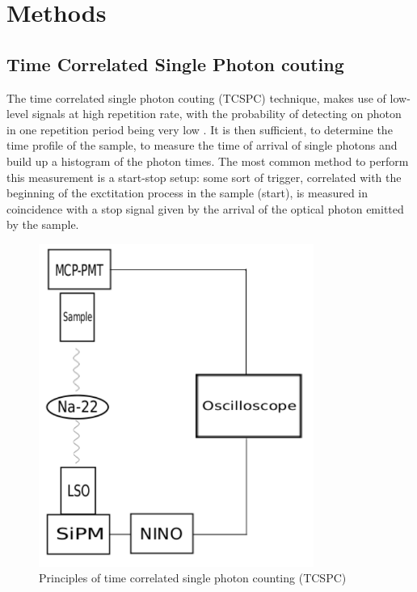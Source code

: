 
\chapter{Methods}


\section{Time Correlated Single Photon couting}

The time correlated single photon couting (TCSPC) technique, makes use of low-level signals at high repetition rate, with the probability of detecting on photon in one repetition period being very low \cite{Becker2005}.
It is then sufficient, to determine the time profile of the sample, to measure the time of arrival of single photons and build up a histogram of the photon times.
The most common method to perform this measurement is a start-stop setup: some sort of trigger, correlated with the beginning of the exctitation process in the sample (start), is measured in coincidence with a stop signal given by the arrival of the optical photon emitted by the sample.
\begin{figure}[htbp]
\begin{center}
\includegraphics[width=9cm]{../Pictures/Chapter_8/electronics.pdf}
\end{center}
\caption[TCSPC technique]{Principles of time correlated single photon counting (TCSPC)}
\label{fig:daw}
\end{figure}
